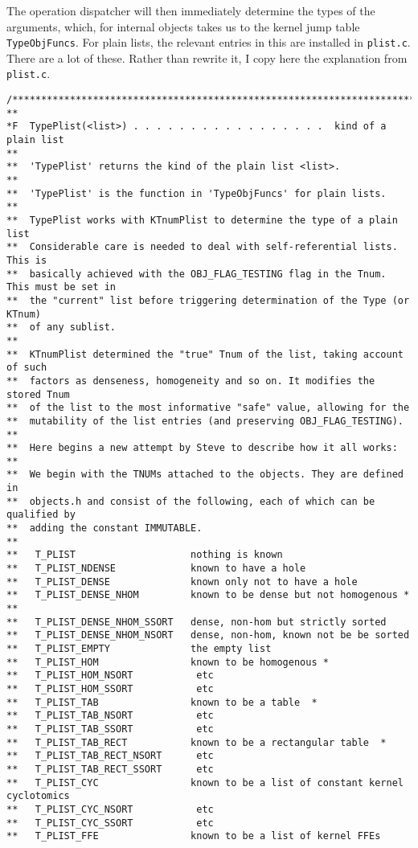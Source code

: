 \documentclass{article}
\begin{document}
The operation dispatcher will then immediately determine the types of
the arguments, which, for internal objects takes us to the kernel
jump table \verb|TypeObjFuncs|. For plain lists, the relevant entries
in this are installed in \verb|plist.c|. There are a lot of
these. Rather than rewrite it, I copy here the  explanation from
\verb|plist.c|.
\begin{verbatim}
/****************************************************************************
**
*F  TypePlist(<list>) . . . . . . . . . . . . . . . . .  kind of a plain list
**
**  'TypePlist' returns the kind of the plain list <list>.
**
**  'TypePlist' is the function in 'TypeObjFuncs' for plain lists.
**
**  TypePlist works with KTnumPlist to determine the type of a plain list
**  Considerable care is needed to deal with self-referential lists. This is
**  basically achieved with the OBJ_FLAG_TESTING flag in the Tnum. This must be set in
**  the "current" list before triggering determination of the Type (or KTnum)
**  of any sublist.
**
**  KTnumPlist determined the "true" Tnum of the list, taking account of such
**  factors as denseness, homogeneity and so on. It modifies the stored Tnum
**  of the list to the most informative "safe" value, allowing for the
**  mutability of the list entries (and preserving OBJ_FLAG_TESTING).
**
**  Here begins a new attempt by Steve to describe how it all works:
**
**  We begin with the TNUMs attached to the objects. They are defined in
**  objects.h and consist of the following, each of which can be qualified by
**  adding the constant IMMUTABLE.
**
**   T_PLIST                    nothing is known
**   T_PLIST_NDENSE             known to have a hole
**   T_PLIST_DENSE              known only not to have a hole
**   T_PLIST_DENSE_NHOM         known to be dense but not homogenous *  **
**   T_PLIST_DENSE_NHOM_SSORT   dense, non-hom but strictly sorted
**   T_PLIST_DENSE_NHOM_NSORT   dense, non-hom, known not be be sorted
**   T_PLIST_EMPTY              the empty list
**   T_PLIST_HOM                known to be homogenous *
**   T_PLIST_HOM_NSORT           etc
**   T_PLIST_HOM_SSORT           etc
**   T_PLIST_TAB                known to be a table  *
**   T_PLIST_TAB_NSORT           etc
**   T_PLIST_TAB_SSORT           etc
**   T_PLIST_TAB_RECT           known to be a rectangular table  *
**   T_PLIST_TAB_RECT_NSORT      etc
**   T_PLIST_TAB_RECT_SSORT      etc
**   T_PLIST_CYC                known to be a list of constant kernel cyclotomics
**   T_PLIST_CYC_NSORT           etc
**   T_PLIST_CYC_SSORT           etc
**   T_PLIST_FFE                known to be a list of kernel FFEs

\end{verbatim}
\end{document}
